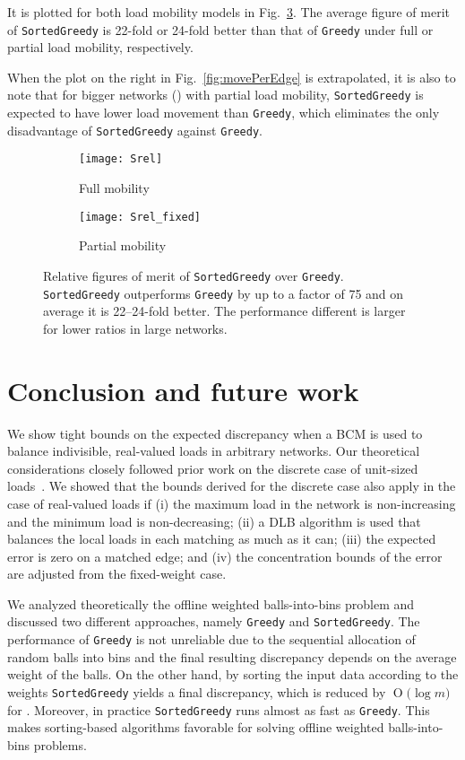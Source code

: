 \documentclass[12pt,psfig,a4]{article}
\newcommand{\sg}{\texttt{SortedGreedy}}
\newcommand{\gr}{\texttt{Greedy}}
\newcommand{\BigO}[1]{\ensuremath{\operatorname{O}\bigl(#1\bigr)}}
\theoremstyle{plain}
\begin{document}
It is plotted for both load mobility models in Fig.~\ref{fig:Srel}. The average figure of merit of \sg{} is 22-fold or 24-fold better than that of \gr{} under full or partial load mobility, respectively. 

When the plot on the right in Fig.~\ref{fig:movePerEdge} is extrapolated, it is also to note that for bigger networks () with partial load mobility, \sg{} is expected to have lower load movement than \gr{}, which eliminates the only disadvantage of \sg{} against \gr{}.
\begin{figure}
\centering	
	\begin{subfigure}[b]{0.44\textwidth}	
		\centering
	      	\texttt{[image: Srel]}
		\caption{Full mobility}
		\label{fig:Srel1}
	\end{subfigure}
	\begin{subfigure}[b]{0.44\textwidth}	
		\centering
	      	\texttt{[image: Srel\_fixed]}
		\caption{Partial mobility}
		\label{fig:Srel2}
	\end{subfigure}
	\caption{Relative figures of merit of \sg{} over \gr{}. \sg{} outperforms \gr{} by up to a factor of 75 and on average it is 22--24-fold better. The performance different is larger for lower  ratios in large networks. } 
	\label{fig:Srel}
\end{figure}


\section{Conclusion and future work}
\label{sec:conclusion}
We show tight bounds on the expected discrepancy when a BCM is used to balance indivisible, real-valued loads in arbitrary networks. Our theoretical considerations closely followed prior work on the discrete case of unit-sized loads~\cite{sauerwald2012tight}. We showed that the bounds derived for the discrete case also apply in the case of real-valued loads if (i) the maximum load in the network is non-increasing and the minimum load is non-decreasing; (ii) a DLB algorithm is used that balances the local loads in each matching as much as it can; (iii) the expected error is zero on a matched edge; and (iv) the concentration bounds of the error are adjusted from the fixed-weight case.

We analyzed theoretically the offline weighted balls-into-bins problem and discussed two different approaches, namely \gr{} and \sg{}. The performance of \gr{} is not unreliable due to the sequential allocation of random  balls into  bins and the final resulting discrepancy  depends on the average weight of the balls. On the other hand, by sorting the input data according to the weights \sg{} yields a final discrepancy, which is reduced by \BigO{\log{m}} for . Moreover, in practice \sg{} runs almost as fast as \gr{}. This makes sorting-based algorithms favorable for solving offline weighted balls-into-bins problems.
\end{document}
